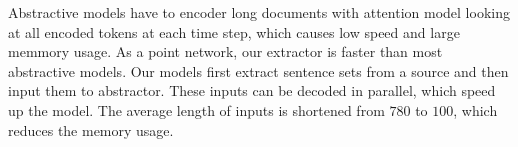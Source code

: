 Abstractive models have to encoder long documents with
attention model looking at all encoded tokens at each time step,
which causes low speed and large memmory usage.
As a point network, our extractor is faster than most abstractive models.
Our models first extract sentence sets from a source
and then input them to abstractor.
These inputs can be decoded in parallel, which speed up the model.
The average length of inputs is shortened from $780$ to $100$,
which reduces the memory usage.




